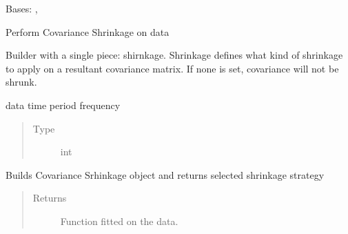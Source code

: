 \documentclass[letterpaper,10pt,english]{sphinxmanual}
\begin{document}
\begin{fulllineitems}
\label{\detokenize{dalio.pipe:dalio.pipe.builders.CovShrink}}
Bases: {\hyperref[\detokenize{dalio.pipe:dalio.pipe.pipe.Pipe}]{}}, 

Perform Covariance Shrinkage on data

Builder with a single piece: shirnkage. Shrinkage defines what kind of
shrinkage to apply on a resultant covariance matrix. If none is set,
covariance will not be shrunk.

\begin{fulllineitems}
\label{\detokenize{dalio.pipe:dalio.pipe.builders.CovShrink.frequency}}
data time period frequency
\begin{quote}\begin{description}
\item[{Type}] \leavevmode
int

\end{description}\end{quote}

\end{fulllineitems}


\begin{fulllineitems}
\label{\detokenize{dalio.pipe:dalio.pipe.builders.CovShrink.build_model}}
Builds Covariance Srhinkage object and returns selected shrinkage
strategy
\begin{quote}\begin{description}
\item[{Returns}] \leavevmode
Function fitted on the data.

\end{description}\end{quote}

\end{fulllineitems}


\end{fulllineitems}
\end{document}
